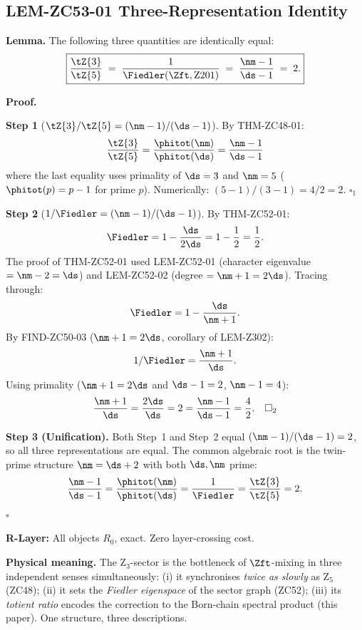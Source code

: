 \documentclass[12pt, a4paper]{article}
\begin{document}
\subsection{LEM-ZC53-01 \quad Three-Representation Identity}
\label{zc53:sec:lem01}


\begin{formalbox}[title={LEM-ZC53-01: Three-Representation
  Identity for the Z$_3$-Bottleneck ($R_0$, Exact)}]
\textbf{Lemma.}
The following three quantities are identically equal:
\begin{equation}\label{zc53:eq:three-rep}
  \boxed{
  \frac{\tZ{3}}{\tZ{5}}
  \;=\;
  \frac{1}{\Fiedler(\Zft,\mathrm{Z201})}
  \;=\;
  \frac{\nm - 1}{\ds - 1}
  \;=\; 2.
  }
\end{equation}

\textbf{Proof.}

\textbf{Step 1} ($\tZ{3}/\tZ{5} = (\nm-1)/(\ds-1)$).
By THM-ZC48-01:
\[
  \frac{\tZ{3}}{\tZ{5}}
  = \frac{\phitot(\nm)}{\phitot(\ds)}
  = \frac{\nm-1}{\ds-1}
\]
where the last equality uses primality of $\ds=3$ and $\nm=5$
($\phitot(p) = p-1$ for prime $p$).
Numerically: $(5-1)/(3-1) = 4/2 = 2$. \hfill$\square_1$

\textbf{Step 2} ($1/\Fiedler = (\nm-1)/(\ds-1)$).
By THM-ZC52-01:
\[
  \Fiedler = 1 - \frac{\ds}{2\ds} = 1 - \frac{1}{2} = \frac{1}{2}.
\]
The proof of THM-ZC52-01 used LEM-ZC52-01
(character eigenvalue $= \nm-2 = \ds$) and LEM-ZC52-02
(degree $= \nm+1 = 2\ds$). Tracing through:
\[
  \Fiedler = 1 - \frac{\ds}{\nm+1}.
\]
By FIND-ZC50-03 ($\nm+1 = 2\ds$, corollary of LEM-Z302):
\[
  1/\Fiedler = \frac{\nm+1}{\ds}.
\]
Using primality ($\nm+1 = 2\ds$ and $\ds-1=2$, $\nm-1=4$):
\[
  \frac{\nm+1}{\ds} = \frac{2\ds}{\ds} = 2
  = \frac{\nm-1}{\ds-1} = \frac{4}{2}. \quad\hfill\square_2
\]

\textbf{Step 3 (Unification).}
Both Step~1 and Step~2 equal $(\nm-1)/(\ds-1) = 2$,
so all three representations are equal.
The common algebraic root is the twin-prime structure
$\nm = \ds + 2$ with both $\ds,\nm$ prime:
\[
  \frac{\nm-1}{\ds-1} = \frac{\phitot(\nm)}{\phitot(\ds)}
  = \frac{1}{\Fiedler} = \frac{\tZ{3}}{\tZ{5}} = 2.
\]
\hfill$\square$

\textbf{R-Layer:} All objects $R_0$, exact. Zero layer-crossing cost.

\textbf{Physical meaning.}
The Z$_3$-sector is the bottleneck of $\Zft$-mixing in three
independent senses simultaneously:
(i) it synchronises \emph{twice as slowly} as Z$_5$ (ZC48);
(ii) it sets the \emph{Fiedler eigenspace} of the sector graph
  (ZC52);
(iii) its \emph{totient ratio} encodes the correction to the
  Born-chain spectral product (this paper).
One structure, three descriptions.
\end{formalbox}
\end{document}
